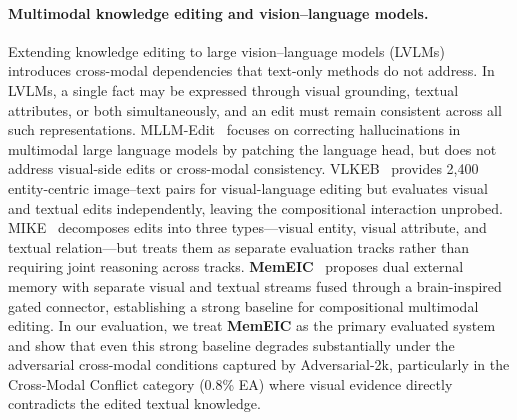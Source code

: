 \documentclass{article}
\newcommand{\memeic}{\textbf{MemEIC}}
\begin{document}
\paragraph{Multimodal knowledge editing and vision--language models.}
Extending knowledge editing to large vision--language models (LVLMs)~\cite{BLIP-2_2023,minigpt24} introduces cross-modal dependencies that text-only methods do not address. In LVLMs, a single fact may be expressed through visual grounding, textual attributes, or both simultaneously, and an edit must remain consistent across all such representations. MLLM-Edit~\cite{mllmedit23} focuses on correcting hallucinations in multimodal large language models by patching the language head, but does not address visual-side edits or cross-modal consistency. VLKEB~\cite{vlkeb24} provides 2{,}400 entity-centric image--text pairs for visual-language editing but evaluates visual and textual edits independently, leaving the compositional interaction unprobed. MIKE~\cite{mike24} decomposes edits into three types---visual entity, visual attribute, and textual relation---but treats them as separate evaluation tracks rather than requiring joint reasoning across tracks. \memeic{}~\cite{memeic2025} proposes dual external memory with separate visual and textual streams fused through a brain-inspired gated connector, establishing a strong baseline for compositional multimodal editing. In our evaluation, we treat \memeic{} as the primary evaluated system and show that even this strong baseline degrades substantially under the adversarial cross-modal conditions captured by Adversarial-2k, particularly in the Cross-Modal Conflict category (0.8\% EA) where visual evidence directly contradicts the edited textual knowledge.
\end{document}
